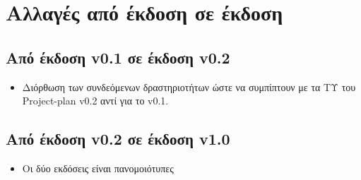 \documentclass[12pt,a4paper]{article}
\begin{document}
\section{Αλλαγές από έκδοση σε έκδοση}

\subsection{Από έκδοση v0.1 σε έκδοση v0.2}
\begin{itemize}
    \item Διόρθωση των συνδεόμενων δραστηριοτήτων ώστε να συμπίπτουν με τα ΤΥ του Project-plan v0.2 αντί για το v0.1.
\end{itemize}

\subsection{Από έκδοση v0.2 σε έκδοση v1.0}
\begin{itemize}
    \item Οι δύο εκδόσεις είναι πανομοιότυπες
\end{itemize}
\end{document}
